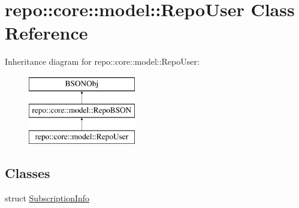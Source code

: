 \hypertarget{classrepo_1_1core_1_1model_1_1_repo_user}{}\section{repo\+:\+:core\+:\+:model\+:\+:Repo\+User Class Reference}
\label{classrepo_1_1core_1_1model_1_1_repo_user}
Inheritance diagram for repo\+:\+:core\+:\+:model\+:\+:Repo\+User\+:\begin{figure}[H]
\begin{center}
\leavevmode
\includegraphics[height=3.000000cm]{classrepo_1_1core_1_1model_1_1_repo_user}
\end{center}
\end{figure}
\subsection*{Classes}
\begin{DoxyCompactItemize}
\item 
struct \hyperlink{structrepo_1_1core_1_1model_1_1_repo_user_1_1_subscription_info}{Subscription\+Info}
\end{DoxyCompactItemize}

